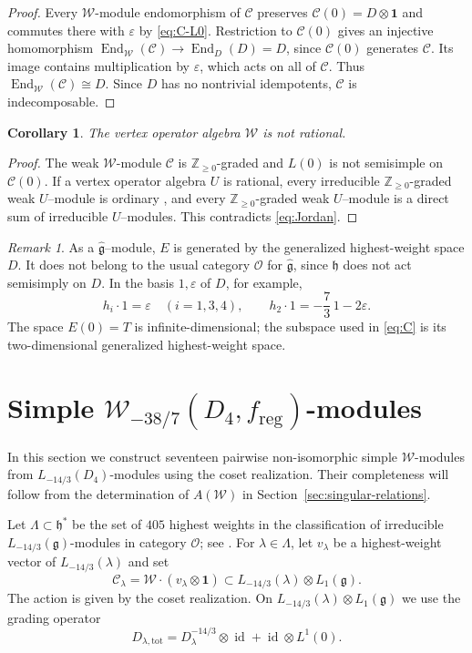 \documentclass[11pt]{amsart}
\numberwithin{equation}{section}
\newtheorem{corollary}[theorem]{Corollary}
\theoremstyle{definition}
\theoremstyle{remark}
\newtheorem{remark}[theorem]{Remark}
\newcommand{\g}{\mathfrak g}
\newcommand{\h}{\mathfrak h}
\newcommand{\one}{\mathbf1}
\newcommand{\W}{\mathcal W}
\newcommand{\End}{\operatorname{End}}
\newcommand{\reg}{\mathrm{reg}}
\newcommand{\id}{\operatorname{id}}
\begin{document}
\begin{proof}
Every $\mathcal W$-module endomorphism of $\mathcal C$ preserves
$\mathcal C(0)=D\otimes\one$ and commutes there with $\varepsilon$
by \eqref{eq:C-L0}. Restriction to $\mathcal C(0)$ gives an
injective homomorphism $\End_{\mathcal W}(\mathcal C)\to\End_D(D)=D$,
since $\mathcal C(0)$ generates $\mathcal C$. Its image contains
multiplication by $\varepsilon$, which acts on all of $\mathcal C$.
Thus $\End_{\mathcal W}(\mathcal C)\cong D$. Since $D$ has no
nontrivial idempotents, $\mathcal C$ is indecomposable.
\end{proof}

\begin{corollary}\label{cor:nonrational}
The vertex operator algebra $\mathcal W$ is not rational.
\end{corollary}
\begin{proof}
The weak $\mathcal W$-module $\mathcal C$ is $\mathbb Z_{\geq 0}$-graded and $L(0)$ is not semisimple
on $\mathcal C(0)$.
If a vertex operator algebra $U$ is rational, every irreducible $\mathbb Z_{\geq 0}$-graded weak
$U$--module is ordinary \cite[Theorem 8.1]{DLM}, and every $\mathbb Z_{\geq 0}$-graded weak
$U$--module is a direct sum of irreducible $U$--modules.
This contradicts \eqref{eq:Jordan}.
\end{proof}

\begin{remark}
As a $\widehat{\g}$--module, $E$ is generated by the generalized
highest-weight space $D$. It does not belong to the usual category
$\mathcal O$ for $\widehat{\g}$, since
$\h$ does not act semisimply on $D$.
In the basis $1,\varepsilon$ of $D$, for example,
\[
 h_i\cdot1=\varepsilon\quad(i=1,3,4),\qquad
 h_2\cdot1=-\frac73\,1-2\varepsilon.
\]
The space $E(0)=T$ is infinite-dimensional; the subspace used in
\eqref{eq:C} is its two-dimensional generalized highest-weight space.
\end{remark}


\section{Simple \texorpdfstring{$\W_{-38/7}(D_4,f_{\reg})$}{W(-38/7)(D4, f reg)}-modules}
\label{sec:simple-modules}
In this section we construct seventeen pairwise non-isomorphic
simple $\mathcal W$-modules from $L_{-14/3}(D_4)$-modules using
the coset realization. Their completeness will follow from the
determination of $A(\mathcal W)$ in
Section~\ref{sec:singular-relations}.
\vskip 5mm

Let $\Lambda\subset\h^*$ be the set of $405$ highest weights
in the classification of irreducible $L_{-14/3}(\g)$-modules in
category $\mathcal O$; see
\cite[Proposition~3.4 and Theorem~3.6]{AV}.
For $\lambda\in\Lambda$, let $v_\lambda$ be a highest-weight vector
of $L_{-14/3}(\lambda)$ and set
\[
  \mathcal C_\lambda
  =\mathcal W\cdot(v_\lambda\otimes\mathbf1)
  \subset L_{-14/3}(\lambda)\otimes L_1(\g).
\]
The action is given by the coset realization. On
$L_{-14/3}(\lambda)\otimes L_1(\g)$ we use the grading operator
\[
 D_{\lambda,\mathrm{tot}}
 =D^{-14/3}_\lambda\otimes\id+\id\otimes L^1(0).
\]
\end{document}
